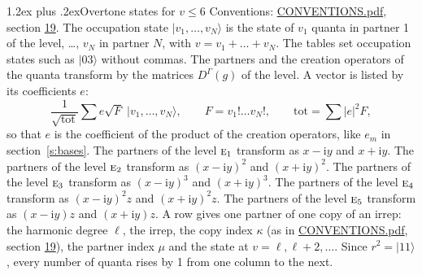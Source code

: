 \documentclass[10pt,a4paper]{article}
\makeatletter
\renewcommand\section{\@startsection{section}{1}{\z@}{-3ex plus -1ex minus -.2ex}%
  {1.2ex plus .2ex}{\normalfont\large\sffamily\bfseries\color{parttitle}}}
\numberwithin{equation}{section}
\newcommand{\irr}[1]{\text{\normalfont\scshape #1}}
\newcommand{\iunit}{\mathrm{i}}
\newcommand{\repD}[1]{D^{#1}}
\newcommand{\mult}{\kappa}
\newcommand{\intx}{\mu}
\newcommand{\occ}[1]{\lvert #1\rangle}
\makeatother
\begin{document}
\section{Overtone states for \texorpdfstring{$v \le 6$}{v \textleq\ 6}}\label{s:overtone_states}
Conventions: \href{../../CONVENTIONS.pdf}{CONVENTIONS.pdf}, section \href{../../CONVENTIONS.pdf\#conv.19}{19}.
\leavevmode\label{n:vector.occupation}\label{n:local.quanta.partner}\label{n:local.weight.occupation}The occupation state $\occ{v_1, \dots, v_N}$ is the state of $v_1$ quanta in partner 1 of the level, \dots, $v_N$ in partner $N$, with $v = v_1 + \dots + v_N$. The tables set occupation states such as $\occ{03}$ without commas. The partners and the creation operators of the quanta transform by the matrices $\repD{\Gamma}(g)$ of the level. A vector is listed by its coefficients $e$:
\begin{equation}\label{e:occupation}\frac{1}{\sqrt{\mathrm{tot}}}\sum e\sqrt{F}\;\occ{v_1, \dots, v_N},\qquad F = v_1!\dots v_N!,\qquad \mathrm{tot} = \sum |e|^2F,\end{equation}
so that $e$ is the coefficient of the product of the creation operators, like $e_m$ in section~\ref{s:bases}. The partners of the level $\irr{e}_{1}$ transform as $x - \iunit y$ and $x + \iunit y$. The partners of the level $\irr{e}_{2}$ transform as $(x - \iunit y)^{2}$ and $(x + \iunit y)^{2}$. The partners of the level $\irr{e}_{3}$ transform as $(x - \iunit y)^{3}$ and $(x + \iunit y)^{3}$. The partners of the level $\irr{e}_{4}$ transform as $(x - \iunit y)^{2} z$ and $(x + \iunit y)^{2} z$. The partners of the level $\irr{e}_{5}$ transform as $(x - \iunit y) z$ and $(x + \iunit y) z$. A row gives one partner of one copy of an irrep: the harmonic degree $\ell$, the irrep, the copy index $\mult$ (as in \href{../../CONVENTIONS.pdf}{CONVENTIONS.pdf}, section \href{../../CONVENTIONS.pdf\#conv.19}{19}), the partner index $\intx$ and the state at $v = \ell, \ell + 2, \dots$. Since $r^2 = \occ{11}$, every number of quanta rises by 1 from one column to the next.
\end{document}
